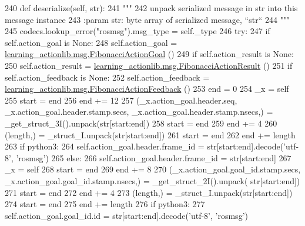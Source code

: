 \begin{DoxyCode}
240   \textcolor{keyword}{def }deserialize(self, str):
241     \textcolor{stringliteral}{"""}
242 \textcolor{stringliteral}{    unpack serialized message in str into this message instance}
243 \textcolor{stringliteral}{    :param str: byte array of serialized message, ``str``}
244 \textcolor{stringliteral}{    """}
245     codecs.lookup\_error(\textcolor{stringliteral}{"rosmsg"}).msg\_type = self.\_type
246     \textcolor{keywordflow}{try}:
247       \textcolor{keywordflow}{if} self.action\_goal \textcolor{keywordflow}{is} \textcolor{keywordtype}{None}:
248         self.action\_goal = \hyperlink{classlearning__actionlib_1_1msg_1_1__FibonacciActionGoal_1_1FibonacciActionGoal}{learning\_actionlib.msg.FibonacciActionGoal}
      ()
249       \textcolor{keywordflow}{if} self.action\_result \textcolor{keywordflow}{is} \textcolor{keywordtype}{None}:
250         self.action\_result = \hyperlink{classlearning__actionlib_1_1msg_1_1__FibonacciActionResult_1_1FibonacciActionResult}{learning\_actionlib.msg.FibonacciActionResult}
      ()
251       \textcolor{keywordflow}{if} self.action\_feedback \textcolor{keywordflow}{is} \textcolor{keywordtype}{None}:
252         self.action\_feedback = \hyperlink{classlearning__actionlib_1_1msg_1_1__FibonacciActionFeedback_1_1FibonacciActionFeedback}{learning\_actionlib.msg.FibonacciActionFeedback}
      ()
253       end = 0
254       \_x = self
255       start = end
256       end += 12
257       (\_x.action\_goal.header.seq, \_x.action\_goal.header.stamp.secs, \_x.action\_goal.header.stamp.nsecs,) = 
      \_get\_struct\_3I().unpack(str[start:end])
258       start = end
259       end += 4
260       (length,) = \_struct\_I.unpack(str[start:end])
261       start = end
262       end += length
263       \textcolor{keywordflow}{if} python3:
264         self.action\_goal.header.frame\_id = str[start:end].decode(\textcolor{stringliteral}{'utf-8'}, \textcolor{stringliteral}{'rosmsg'})
265       \textcolor{keywordflow}{else}:
266         self.action\_goal.header.frame\_id = str[start:end]
267       \_x = self
268       start = end
269       end += 8
270       (\_x.action\_goal.goal\_id.stamp.secs, \_x.action\_goal.goal\_id.stamp.nsecs,) = \_get\_struct\_2I().unpack(
      str[start:end])
271       start = end
272       end += 4
273       (length,) = \_struct\_I.unpack(str[start:end])
274       start = end
275       end += length
276       \textcolor{keywordflow}{if} python3:
277         self.action\_goal.goal\_id.id = str[start:end].decode(\textcolor{stringliteral}{'utf-8'}, \textcolor{stringliteral}{'rosmsg'})

\end{DoxyCode}

